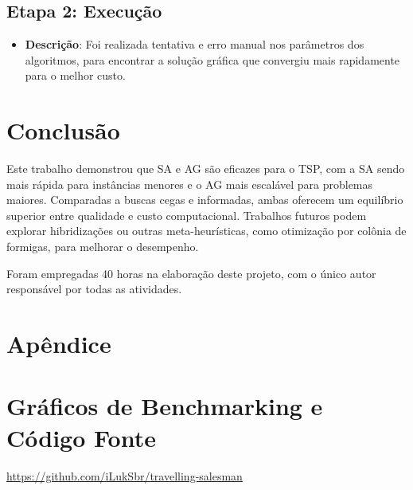 \documentclass[11pt]{article}
\begin{document}
\subsection{Etapa 2: Execução}
\begin{itemize}
    \item \textbf{Descrição}: Foi realizada tentativa e erro manual nos parâmetros dos algoritmos, para encontrar a solução gráfica que convergiu mais rapidamente para o melhor custo.
\end{itemize}

\section{Conclusão}
Este trabalho demonstrou que SA e AG são eficazes para o TSP, com a SA sendo mais rápida para instâncias menores e o AG mais escalável para problemas maiores. Comparadas a buscas cegas e informadas, ambas oferecem um equilíbrio superior entre qualidade e custo computacional. Trabalhos futuros podem explorar hibridizações ou outras meta-heurísticas, como otimização por colônia de formigas, para melhorar o desempenho.

Foram empregadas 40 horas na elaboração deste projeto, com o único autor responsável por todas as atividades.




\section*{Apêndice}
\appendix

\section{Gráficos de Benchmarking e Código Fonte}\label{app:code}
\href{https://github.com/iLukSbr/travelling-salesman}{https://github.com/iLukSbr/travelling-salesman}

\clearpage
\end{document}
